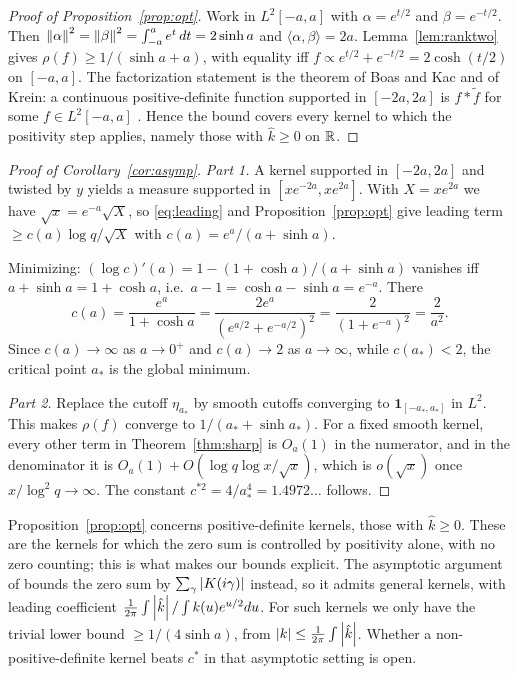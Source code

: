 \begin{proof}[Proof of Proposition~\ref{prop:opt}]
Work in $L^2[-a,a]$ with $\alpha=e^{t/2}$ and $\beta=e^{-t/2}$. Then $\left\lVert \alpha \right\rVert^2=\left\lVert \beta \right\rVert^2=\int_{-a}^ae^t\,dt=2\sinh a$ and
$\langle\alpha,\beta\rangle=2a$. Lemma~\ref{lem:ranktwo} gives $\rho(f)\ge1/(\sinh a+a)$, with equality iff
$f\propto e^{t/2}+e^{-t/2}=2\cosh(t/2)$ on $[-a,a]$. The factorization statement is the theorem of Boas and Kac
and of Krein: a continuous positive-definite function supported in $[-2a,2a]$ is $f*\tilde f$ for some
$f\in L^2[-a,a]$ \cite{boaskac1945,ehmgneitingrichards2004}. Hence the bound covers every kernel to which
the positivity step applies, namely those with $\hat k\ge0$ on $\mathbb{R}$.
\end{proof}

\begin{proof}[Proof of Corollary~\ref{cor:asymp}]
\emph{Part 1.} A kernel supported in $[-2a,2a]$ and twisted by $y$ yields a measure supported in
$[xe^{-2a},xe^{2a}]$. With $X=xe^{2a}$ we have $\sqrt x=e^{-a}\sqrt X$, so \eqref{eq:leading} and
Proposition~\ref{prop:opt} give leading term $\ge c(a)\log q/\sqrt X$ with $c(a)=e^a/(a+\sinh a)$.

Minimizing: $(\log c)'(a)=1-(1+\cosh a)/(a+\sinh a)$ vanishes iff $a+\sinh a=1+\cosh a$, i.e.\
$a-1=\cosh a-\sinh a=e^{-a}$. There
\[
  c(a)=\frac{e^a}{1+\cosh a}=\frac{2e^a}{(e^{a/2}+e^{-a/2})^2}=\frac2{(1+e^{-a})^2}=\frac2{a^2}.
\]
Since $c(a)\to\infty$ as $a\to0^+$ and $c(a)\to2$ as $a\to\infty$, while $c(a_*)<2$, the critical point $a_*$ is the
global minimum.

\emph{Part 2.} Replace the cutoff $\eta_{a_*}$ by smooth cutoffs converging to $\mathbf 1_{[-a_*,a_*]}$ in $L^2$. This
makes $\rho(f)$ converge to $1/(a_*+\sinh a_*)$. For a fixed smooth kernel, every other term in
Theorem~\ref{thm:sharp} is $O_a(1)$ in the numerator, and in the denominator it is $O_a(1)+O(\log q\log x/\sqrt x)$,
which is $o(\sqrt x)$ once $x/\log^2q\to\infty$. The constant $c^{*2}=4/a_*^4=1.4972\ldots$ follows.
\end{proof}

\begin{remark}[Scope]
Proposition~\ref{prop:opt} concerns positive-definite kernels, those with $\hat k\ge0$. These are the kernels for which
the zero sum is controlled by positivity alone, with no zero counting; this is what makes our bounds explicit. The asymptotic
argument of \cite[Lemma~6.1]{lls2015} bounds the zero sum by $\sum_\gamma\left\lvert K(i\gamma) \right\rvert$ instead, so it admits general kernels, with
leading coefficient $\frac1{2\pi}\int\left\lvert \hat k \right\rvert/\int k(u)e^{u/2}du$. For such kernels we only have the trivial lower bound
$\ge1/(4\sinh a)$, from $\left\lvert k \right\rvert\le\frac1{2\pi}\int\left\lvert \hat k \right\rvert$. Whether a non-positive-definite kernel beats $c^*$ in that asymptotic
setting is open.
\end{remark}

